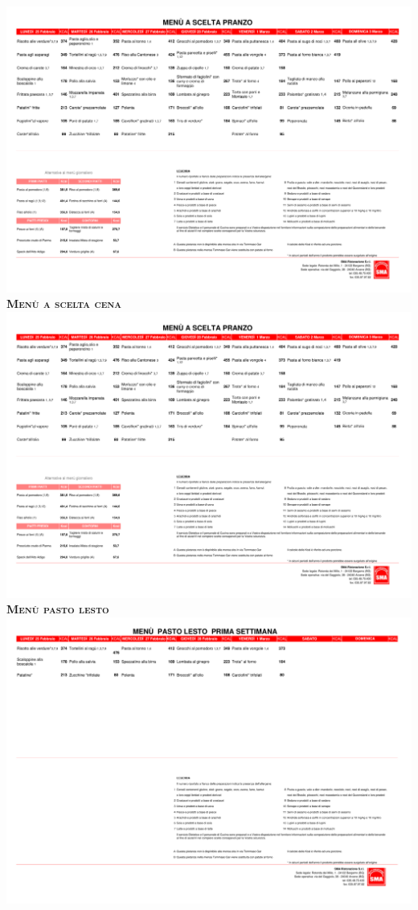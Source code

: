 \documentclass{article}
\begin{document}
\begin{center}
\includegraphics[trim=0cm 15.7cm 0cm 2.7cm,clip,page=9,width=\textwidth,]{scelta.pdf}
\vspace{0.3cm}
{\Huge \textbf{\textsc{Menù a scelta cena}}}\\
\includegraphics[trim=0cm 17.3cm 0cm 2cm,clip,page=10,width=\textwidth,]{scelta.pdf}
\vspace{0.3cm}
{\Huge \textbf{\textsc{Menù pasto lesto}}}\\
\includegraphics[trim=0cm 23cm 0cm 2cm,clip,page=5,width=\textwidth,]{lesto.pdf}
\end{center}
\end{document}
